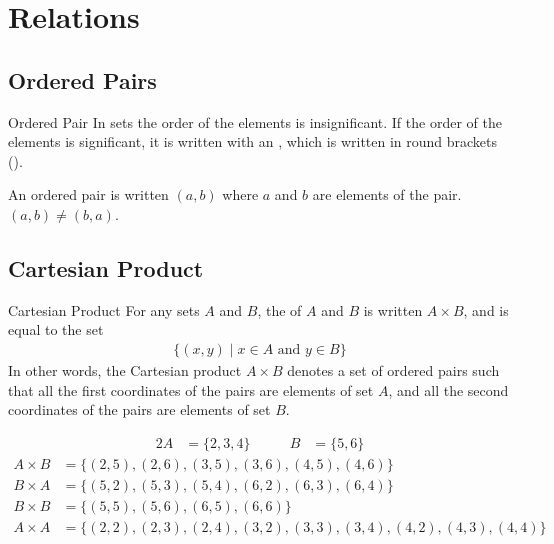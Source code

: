 \documentclass[../notes.tex]{subfiles}
\begin{document}
	\ifSubfilesClassLoaded{\setcounter{chapter}{4}}{}
	\chapter{Relations}
		\section{Ordered Pairs}
			\begin{definition}{Ordered Pair}
				In sets the order of the elements is insignificant. If the order of the elements is significant, it is written with an , which is written in round brackets ().
			\end{definition}
			\nopagebreak
			\begin{example}
				An ordered pair is written $(a, b)$ where $a$ and $b$ are elements of the pair. $(a, b) \neq (b, a)$.
			\end{example}
		\section{Cartesian Product}
			\begin{definition}{Cartesian Product}
				For any sets $A$ and $B$, the  of $A$ and $B$ is written $A \times B$, and is equal to the set
				\begin{align*}
					\bigl\{(x, y) \mid x \in A \text{ and } y \in B\bigr\}
				\end{align*}
				In other words, the Cartesian product $A \times B$ denotes a set of ordered pairs such that all the first coordinates of the pairs are elements of set $A$, and all the second coordinates of the pairs are elements of set $B$.
			\end{definition}
			\nopagebreak
				\begin{example}[width=0.75\textwidth]
					\begin{alignat*}{2}
						A &= \{2, 3, 4\} \qquad & B &= \{5, 6\}
					\end{alignat*}
					\begin{align*}
						A \times B &= \bigl\{(2, 5), (2, 6), (3, 5), (3, 6), (4, 5), (4, 6)\bigr\}\\
						B \times A &= \bigl\{(5, 2), (5, 3), (5, 4), (6, 2), (6, 3), (6, 4)\bigr\}\\
						B \times B &= \bigl\{(5, 5), (5, 6), (6, 5), (6, 6)\bigr\}\\
						A \times A &= \bigl\{(2, 2), (2, 3), (2, 4), (3, 2), (3, 3), (3, 4), (4, 2), (4, 3), (4, 4)\bigr\}
					\end{align*} 
				\end{example}
		\pagebreak
\end{document}
